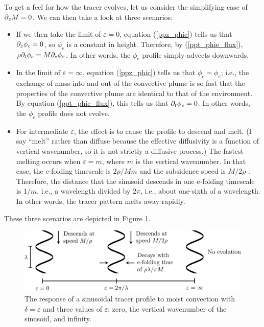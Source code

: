 \documentclass[12pt]{article}
\begin{document}
To get a feel for how the tracer evolves, let us consider the simplifying case of $\partial_z M = 0$.  We can then take a look at three scenarios:
\begin{itemize}
\item If we then take the limit of $\varepsilon = 0$, equation (\ref{ppz_phic}) tells us that $\partial_z \phi_c = 0$, so $\phi_c$ is a constant in height.  Therefore, by (\ref{ppt_phie_flux}), $\rho \partial_t \phi_e = M \partial_z \phi_e$.  In other words, the $\phi_e$ profile simply advects downwards.
\item In the limit of $\varepsilon = \infty$, equation (\ref{ppz_phic}) tells us that $\phi_c = \phi_e$; i.e., the exchange of mass into and out of the convective plume is so fast that the properties of the convective plume are identical to that of the environment.  By equation (\ref{ppt_phie_flux}), this tells us that $\partial_t \phi_e = 0$.  In other words, the $\phi_e$ profile does not evolve.
\item For intermediate $\varepsilon$, the effect is to cause the profile to descend and melt.  (I say ``melt'' rather than diffuse because the effective diffusivity is a function of vertical wavenumber, so it is not strictly a diffusive process.)  The fastest melting occurs when $\varepsilon = m$, where $m$ is the vertical wavenumber.  In that case, the e-folding timescale is $2\rho/Mm$ and the subsidence speed is $M/2\rho$ \citep[see][for details]{12rayleigh}.  Therefore, the distance that the sinusoid descends in one e-folding timescale is $1/m$, i.e., a wavelength divided by $2\pi$, i.e., about one-sixth of a wavelength.  In other words, the tracer pattern melts away rapidly.
\end{itemize}
These three scenarios are depicted in Figure \ref{17leshouches_sine}.


\begin{figure}
\begin{center}
\includegraphics[width=6in]{../figures/17leshouches_sine.pdf}
\caption{The response of a sinusoidal tracer profile to moist convection with $\delta = \varepsilon$ and three values of $\varepsilon$: zero, the vertical wavenumber of the sinusoid, and infinity.}
\label{17leshouches_sine}
\end{center}
\end{figure}
\end{document}
